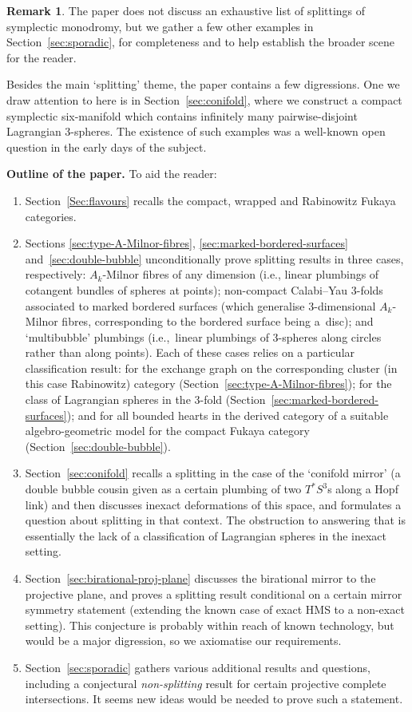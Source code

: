 \documentclass[pdftex]{sigma}
\theoremstyle{definition}
\newtheorem{rmk}[thm]{Remark}
\numberwithin{equation}{section}
\begin{document}
\begin{rmk}
The paper does not discuss an exhaustive list of splittings of symplectic monodromy, but we gather a few other examples in Section~\ref{sec:sporadic}, for completeness and to help establish the broader scene for the reader.
\end{rmk}

Besides the main `splitting' theme, the paper contains a few digressions. One we draw attention to here is in Section~\ref{sec:conifold}, where we construct a compact symplectic six-manifold which contains infinitely many pairwise-disjoint Lagrangian 3-spheres. The existence of such examples was a well-known open question in the early days of the subject.

\bigskip

\textbf{Outline of the paper.} To aid the reader:
\begin{enumerate}\itemsep=0pt
\item Section~\ref{Sec:flavours} recalls the compact, wrapped and Rabinowitz Fukaya categories.
 \item Sections \ref{sec:type-A-Milnor-fibres}, \ref{sec:marked-bordered-surfaces} and~\ref{sec:double-bubble} unconditionally prove splitting results in three cases, respectively: $A_k$\nobreakdash-Milnor fibres of any dimension (i.e., linear plumbings of cotangent bundles of spheres at points); non-compact Calabi--Yau 3-folds associated to marked bordered surfaces (which generalise 3-dimensional $A_k$-Milnor fibres, corresponding to the bordered surface being a~disc); and `multibubble' plumbings (i.e.,~linear plumbings of 3-spheres along circles rather than along points). Each of these cases relies on a particular classification result: for the exchange graph on the corresponding cluster (in this case Rabinowitz) category (Section~\ref{sec:type-A-Milnor-fibres}); for the class of Lagrangian spheres in the 3-fold (Section~\ref{sec:marked-bordered-surfaces}); and for all bounded hearts in the derived category of a suitable algebro-geometric model for the compact Fukaya category (Section~\ref{sec:double-bubble}).
 \item Section~\ref{sec:conifold} recalls a splitting in the case of the `conifold mirror' (a double bubble cousin given as a certain plumbing of two $T^*S^3$s along a Hopf link) and then discusses inexact deformations of this space, and formulates a question about splitting in that context. The obstruction to answering that is essentially the lack of a classification of Lagrangian spheres in the inexact setting.
 \item Section~\ref{sec:birational-proj-plane} discusses the birational mirror to the projective plane, and proves a splitting result conditional on a certain mirror symmetry statement (extending the known case of exact HMS to a non-exact setting). This conjecture is probably within reach of known technology, but would be a major digression, so we axiomatise our requirements.
 \item Section~\ref{sec:sporadic} gathers various additional results and questions, including a conjectural \emph{non-splitting} result for certain projective complete intersections. It seems new ideas would be needed to prove such a statement.
\end{enumerate}
\end{document}

